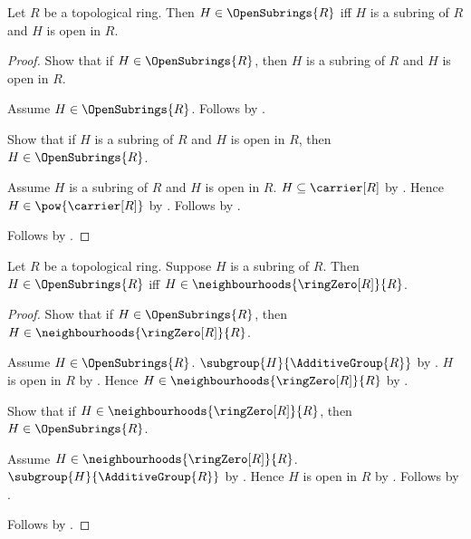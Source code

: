 \begin{proposition}\label{open_subrings_iff}
    Let $R$ be a topological ring.
    Then $H\in\OpenSubrings{R}$ iff
        $H$ is a subring of $R$ and $H$ is open in $R$.
\end{proposition}
\begin{proof}
    Show that if $H\in\OpenSubrings{R}$, then
        $H$ is a subring of $R$ and $H$ is open in $R$.
    \begin{subproof}
        Assume $H\in\OpenSubrings{R}$.
        Follows by .
    \end{subproof}
    Show that if $H$ is a subring of $R$ and $H$ is open in $R$, then
        $H\in\OpenSubrings{R}$.
    \begin{subproof}
        Assume $H$ is a subring of $R$ and $H$ is open in $R$.
        $H\subseteq\carrier[R]$ by .
        Hence $H\in\pow{\carrier[R]}$ by .
        Follows by .
    \end{subproof}
    Follows by \auto.
\end{proof}

\begin{theorem}\label{open_subring_iff_neighbourhood_of_zero}
    Let $R$ be a topological ring.
    Suppose $H$ is a subring of $R$.
    Then $H\in\OpenSubrings{R}$ iff
        $H\in\neighbourhoods{\ringZero[R]}{R}$.
\end{theorem}
\begin{proof}
    Show that if $H\in\OpenSubrings{R}$, then
        $H\in\neighbourhoods{\ringZero[R]}{R}$.
    \begin{subproof}
        Assume $H\in\OpenSubrings{R}$.
        $\subgroup{H}{\AdditiveGroup{R}}$ by
            .
        $H$ is open in $R$ by .
        Hence $H\in\neighbourhoods{\ringZero[R]}{R}$ by
            .
    \end{subproof}
    Show that if $H\in\neighbourhoods{\ringZero[R]}{R}$, then
        $H\in\OpenSubrings{R}$.
    \begin{subproof}
        Assume $H\in\neighbourhoods{\ringZero[R]}{R}$.
        $\subgroup{H}{\AdditiveGroup{R}}$ by
            .
        Hence $H$ is open in $R$ by
            .
        Follows by .
    \end{subproof}
    Follows by \auto.
\end{proof}

